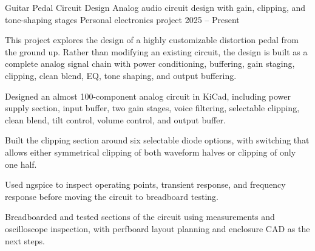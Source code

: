 \projectentry
  {Guitar Pedal Circuit Design}
  {Analog audio circuit design with gain, clipping, and tone-shaping stages}
  {Personal electronics project}
  {2025 -- Present}
  {    }
  {\pedalfigure}
  {This project explores the design of a highly customizable distortion pedal from the ground up. Rather than modifying an existing circuit, the design is built as a complete analog signal chain with power conditioning, buffering, gain staging, clipping, clean blend, EQ, tone shaping, and output buffering.

  \begin{projectbullets}
    \item Designed an almost 100-component analog circuit in KiCad, including power supply section, input buffer, two gain stages, voice filtering, selectable clipping, clean blend, tilt control, volume control, and output buffer.
    \item Built the clipping section around six selectable diode options, with switching that allows either symmetrical clipping of both waveform halves or clipping of only one half.
    \item Used ngspice to inspect operating points, transient response, and frequency response before moving the circuit to breadboard testing.
    \item Breadboarded and tested sections of the circuit using measurements and oscilloscope inspection, with perfboard layout planning and enclosure CAD as the next steps.
  \end{projectbullets}}

\projectseparator

\clearpage

